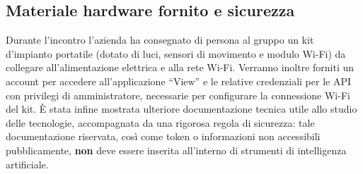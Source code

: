 \documentclass[11pt, a4paper]{article}
\begin{document}
\subsection{Materiale hardware fornito e sicurezza}
Durante l'incontro l'azienda ha consegnato di persona al gruppo un kit d'impianto portatile (dotato di luci, sensori di movimento e modulo Wi-Fi) da collegare all'alimentazione elettrica e alla rete Wi-Fi. Verranno inoltre forniti un account per accedere all'applicazione ``View'' e le relative credenziali per le API con privilegi di amministratore, necessarie per configurare la connessione Wi-Fi del kit. È stata infine mostrata ulteriore documentazione tecnica utile allo studio delle tecnologie, accompagnata da una rigorosa regola di sicurezza: tale documentazione riservata, così come token o informazioni non accessibili pubblicamente, \textbf{non} deve essere inserita all'interno di strumenti di intelligenza artificiale.
\end{document}
